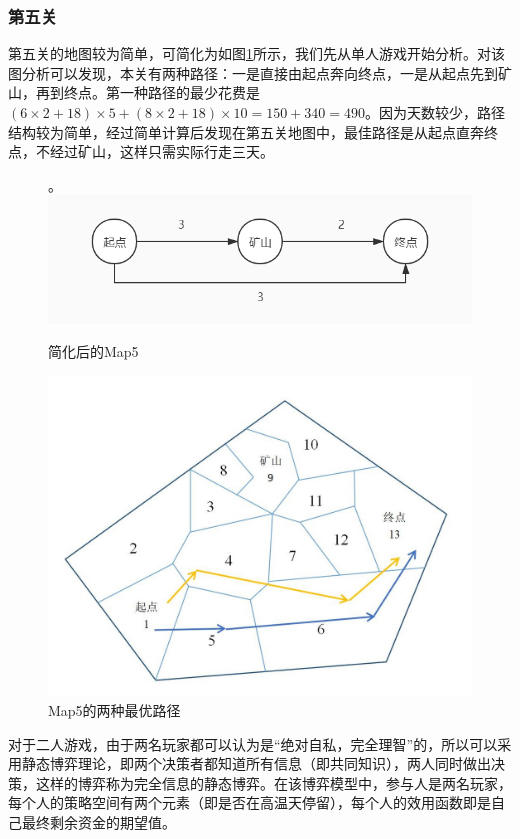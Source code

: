 \documentclass[withoutpre]{cumcmthesis} %
\begin{document}
\subsubsection{第五关}
第五关的地图较为简单，可简化为如图\cref{fig:map5}所示，我们先从单人游戏开始分析。对该图分析可以发现，本关有两种路径：一是直接由起点奔向终点，一是从起点先到矿山，再到终点。第一种路径的最少花费是$(6\times2+18)\times5+(8\times2+18)\times10=150+340=490$。因为天数较少，路径结构较为简单，经过简单计算后发现在第五关地图中，最佳路径是从起点直奔终点，不经过矿山，这样只需实际行走三天。
\begin{figure}[H]
	\centering。
	\includegraphics[scale=0.5]{figures/map3.jpg}
	\caption{简化后的Map5}
	\label{fig:map5}
\end{figure}
\begin{figure}[H]
	\centering
	\includegraphics[scale=0.5]{figures/map5path}
	\caption{Map5的两种最优路径}	
\end{figure}
对于二人游戏，由于两名玩家都可以认为是“绝对自私，完全理智”的，所以可以采用静态博弈理论，即两个决策者都知道所有信息（即共同知识），两人同时做出决策，这样的博弈称为完全信息的静态博弈。在该博弈模型中，参与人是两名玩家，每个人的策略空间有两个元素（即是否在高温天停留），每个人的效用函数即是自己最终剩余资金的期望值。
\end{document}
